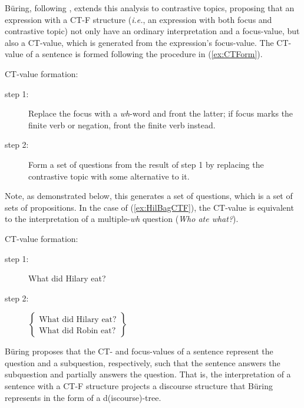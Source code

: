 \documentclass[
]{RCL}
\begin{document}
B\"uring, following \citet{roberts2012information}, extends this analysis to contrastive topics, proposing that an expression with a CT-F structure (\textit{i.e.}, an expression with both focus and contrastive topic) not only have an ordinary interpretation and a focus-value, but also a CT-value, which is generated from the expression's focus-value.
The CT-value of a sentence is formed following the procedure in (\ref{ex:CTForm}).
\begin{exe}
	\ex CT-value formation:\label{ex:CTForm}
	\begin{description}
		\item[step 1:] Replace the focus with a \textit{wh}-word and front the latter; if focus marks the finite verb or negation, front the finite verb instead.
		\item[step 2:] Form a set of questions from the result of step 1 by replacing the contrastive topic with some alternative to it.\hfill\citep{buring2003d}
	\end{description}
\end{exe}
Note, as demonstrated below, this generates a set of questions, which is a set of sets of propositions.
In the case of (\ref{ex:HilBagCTF}), the CT-value is  equivalent to the interpretation of a multiple-\textit{wh} question (\textit{Who ate what?}).
\begin{exe}
	\ex
	\begin{xlist}
		\ex CT-value formation:
		\begin{description}
			\item[step 1: ] What did Hilary eat?
			\item[step 2: ] $
				\begin{Bmatrix}
					\text{What did Hilary eat?}\\
					\text{What did Robin eat?}
				\end{Bmatrix}$
		\end{description}
	\end{xlist}
\end{exe}
B\"uring proposes that the CT- and focus-values of a sentence represent the question and a subquestion, respectively, such that the sentence answers the subquestion and partially answers the question.
That is, the interpretation of a sentence with a CT-F structure projects a discourse structure that B\"uring represents in the form of a d(iscourse)-tree.
\end{document}
